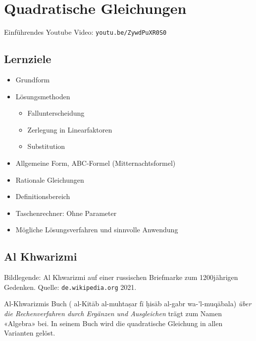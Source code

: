 \section{Quadratische Gleichungen}


Einführendes Youtube Video: \texttt{youtu.be/ZywdPuXR0S0}

\subsection*{Lernziele}

\begin{itemize}
\item Grundform
\item Lösungsmethoden
  \begin{itemize}
    \item{Fallunterscheidung}
    \item{Zerlegung in Linearfaktoren}
    \item{Substitution}
  \end{itemize}
\item Allgemeine Form, ABC-Formel (Mitternachtsformel)
\item Rationale Gleichungen
\item Definitionsbereich
\item Taschenrechner: Ohne Parameter
\item Mögliche Lösungsverfahren und sinnvolle Anwendung
\end{itemize}
\newpage


\subsection{Al Khwarizmi}
Bildlegende: Al Khwarizmi auf einer russischen Briefmarke zum
1200jährigen Gedenken. Quelle: \texttt{de.wikipedia.org} 2021.

Al-Khwarizmis Buch (
al-Kit\={a}b al-muhta\d{s}ar f\={i} \d{h}is\={a}b al-gabr wa-\'{}l-muq\={a}bala) \textit{über die Rechenverfahren durch Ergänzen und
Ausgleichen} trägt zum Namen «Algebra» bei. In seinem Buch wird die
quadratische Gleichung in allen Varianten gelöst.

